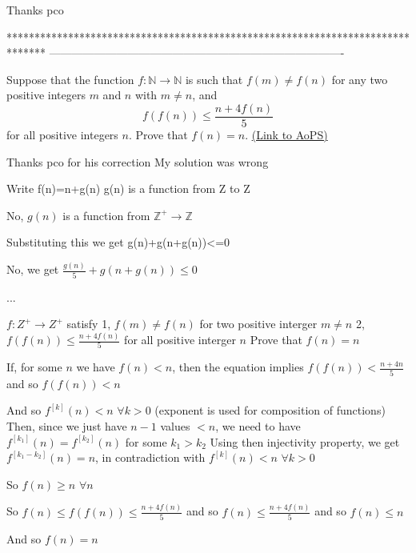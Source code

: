 \begin{solution}
	Thanks pco
\end{solution}
*******************************************************************************
-------------------------------------------------------------------------------

\begin{problem}
	Suppose that the function $f: \mathbb N \to \mathbb N$ is such that $f(m) \neq f(n)$ for any two positive integers $m$ and $n$ with $m \neq n$, and
\[f(f(n))\leq \frac{n+4f(n)}{5}\]
for all positive integers $n$. Prove that $f(n)=n$.
	\flushright \href{https://artofproblemsolving.com/community/c6h389309}{(Link to AoPS)}
\end{problem}



\begin{solution}
	Thanks pco for his correction
My solution was wrong
\end{solution}



\begin{solution}
	\begin{tcolorbox}Write f(n)=n+g(n)
g(n) is a function from Z to Z\end{tcolorbox}
No, $g(n)$ is a function from $\mathbb Z^+\to\mathbb Z$
\begin{tcolorbox}Substituting this we get
g(n)+g(n+g(n))<=0\end{tcolorbox}
No, we get $\frac{g(n)}5+g(n+g(n))\le 0$

...
\end{solution}



\begin{solution}
	\begin{tcolorbox}$f:Z^{+}\to Z^+$ satisfy
1, $f(m)\neq f(n)$ for two  positive interger $m\neq n$
2, $f(f(n))\leq \frac{n+4f(n)}{5}$ for all positive interger $n$
Prove that $f(n)=n$\end{tcolorbox}
If, for some $n$ we have $f(n)<n$, then the equation implies $f(f(n))<\frac{n+4n}5$ and so $f(f(n))<n$

And so $f^{[k]}(n)<n$ $\forall k>0$ (exponent is used for composition of functions)
Then, since we just have $n-1$ values $<n$, we need to have $f^{[k_1]}(n)=f^{[k_2]}(n)$ for some $k_1>k_2$
Using then injectivity property, we get $f^{[k_1-k_2]}(n)=n$, in contradiction with $f^{[k]}(n)<n$ $\forall k>0$

So $f(n)\ge n$ $\forall n$

So $f(n)\le f(f(n))\le \frac{n+4f(n)}5$ and so $f(n)\le\frac{n+4f(n)}5$ and so $f(n)\le n$

And so $\boxed{f(n)=n}$
\end{solution}



